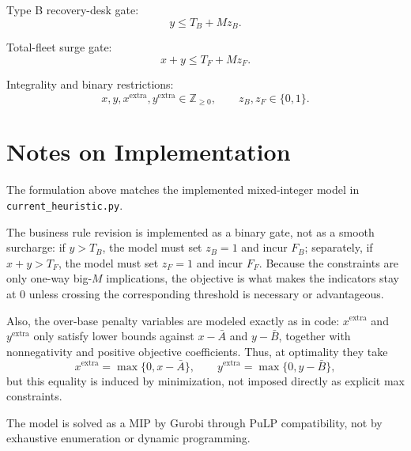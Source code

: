 Type B recovery-desk gate:
\[
y \le T_B + M z_B.
\]

Total-fleet surge gate:
\[
x + y \le T_F + M z_F.
\]

Integrality and binary restrictions:
\[
x,y,x^{\text{extra}},y^{\text{extra}} \in \mathbb{Z}_{\ge 0},\qquad
z_B,z_F \in \{0,1\}.
\]

\section*{Notes on Implementation}

The formulation above matches the implemented mixed-integer model in \texttt{current\_heuristic.py}.

The business rule revision is implemented as a binary gate, not as a smooth surcharge: if \(y>T_B\), the model must set \(z_B=1\) and incur \(F_B\); separately, if \(x+y>T_F\), the model must set \(z_F=1\) and incur \(F_F\). Because the constraints are only one-way big-\(M\) implications, the objective is what makes the indicators stay at \(0\) unless crossing the corresponding threshold is necessary or advantageous.

Also, the over-base penalty variables are modeled exactly as in code: \(x^{\text{extra}}\) and \(y^{\text{extra}}\) only satisfy lower bounds against \(x-\bar A\) and \(y-\bar B\), together with nonnegativity and positive objective coefficients. Thus, at optimality they take
\[
x^{\text{extra}}=\max\{0,x-\bar A\},\qquad
y^{\text{extra}}=\max\{0,y-\bar B\},
\]
but this equality is induced by minimization, not imposed directly as explicit max constraints.

The model is solved as a MIP by Gurobi through PuLP compatibility, not by exhaustive enumeration or dynamic programming.

